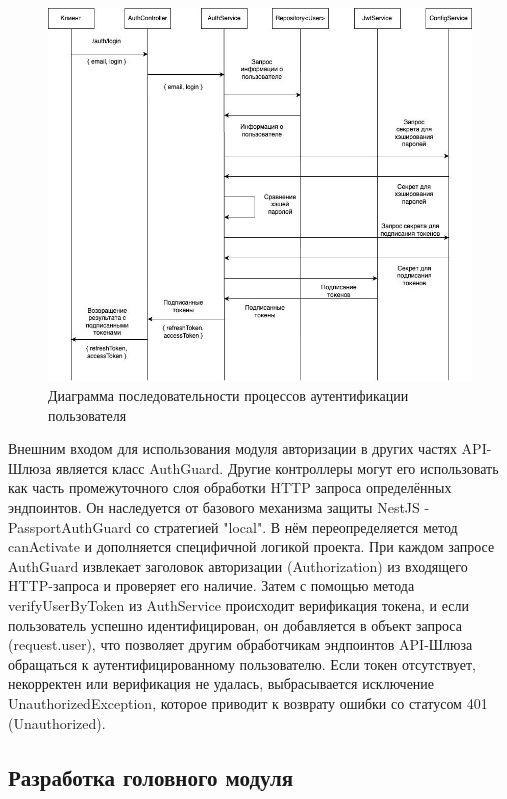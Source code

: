 	\begin{figure}[ht!] 
		\center
		\includegraphics [scale=0.4] {my_folder/images//login_processes}
		\caption{Диаграмма последовательности процессов аутентификации пользователя} 
		\label{fig:login_processes}  
	\end{figure}

	Внешним входом для использования модуля авторизации в других частях API-Шлюза является класс AuthGuard. Другие контроллеры могут его использовать как часть промежуточного слоя обработки HTTP запроса определённых эндпоинтов. Он наследуется от базового механизма защиты NestJS - PassportAuthGuard со стратегией "local". В нём переопределяется метод canActivate и дополняется специфичной логикой проекта. При каждом запросе AuthGuard извлекает заголовок авторизации (Authorization) из входящего HTTP-запроса и проверяет его наличие. Затем с помощью метода verifyUserByToken из AuthService происходит верификация токена, и если пользователь успешно идентифицирован, он добавляется в объект запроса (request.user), что позволяет другим обработчикам эндпоинтов API-Шлюза обращаться к аутентифицированному пользователю. Если токен отсутствует, некорректен или верификация не удалась, выбрасывается исключение UnauthorizedException, которое приводит к возврату ошибки со статусом 401 (Unauthorized).

	\subsection{Разработка головного модуля}


